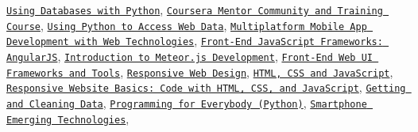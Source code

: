 \documentclass[letterpaper]{article}
\renewenvironment{itemize}{
  \begin{list}{}{
    \setlength{\leftmargin}{1.5em}
  }
}{
  \end{list}
}
\begin{document}
\begin{itemize}

  \href{https://www.coursera.org/account/accomplishments/certificate/V6SUEBUTNR72?lipi=urn%3Ali%3Apage%3Ad_flagship3_profile_view_base%3Bot6rr9dtS3WBieVYcbWG0Q%3D%3D}{\tt Using Databases with Python},
  \href{https://www.coursera.org/account/accomplishments/verify/P89HGQTM8BRU?lipi=urn%3Ali%3Apage%3Ad_flagship3_profile_view_base%3Bot6rr9dtS3WBieVYcbWG0Q%3D%3D}{\tt Coursera Mentor Community and Training Course},
  \href{https://www.coursera.org/account/accomplishments/verify/UCHV3GUX82V4?lipi=urn%3Ali%3Apage%3Ad_flagship3_profile_view_base%3Bot6rr9dtS3WBieVYcbWG0Q%3D%3D}{\tt Using Python to Access Web Data},
  \href{https://www.coursera.org/account/accomplishments/verify/8SRK8FNBN8MR?lipi=urn%3Ali%3Apage%3Ad_flagship3_profile_view_base%3Bot6rr9dtS3WBieVYcbWG0Q%3D%3D}{\tt Multiplatform Mobile App Development with Web Technologies},
  \href{https://www.coursera.org/account/accomplishments/records/9C8QWTNG6PR7?lipi=urn%3Ali%3Apage%3Ad_flagship3_profile_view_base%3Bot6rr9dtS3WBieVYcbWG0Q%3D%3D}{\tt Front-End JavaScript Frameworks: AngularJS},
  \href{https://www.coursera.org/account/accomplishments/records/CZHBPE43RH5C?lipi=urn%3Ali%3Apage%3Ad_flagship3_profile_view_base%3Bot6rr9dtS3WBieVYcbWG0Q%3D%3D}{\tt Introduction to Meteor.js Development},
  \href{https://www.coursera.org/account/accomplishments/records/6P9Q9L5GH9PD?lipi=urn%3Ali%3Apage%3Ad_flagship3_profile_view_base%3Bot6rr9dtS3WBieVYcbWG0Q%3D%3D}{\tt Front-End Web UI Frameworks and Tools},
  \href{https://www.coursera.org/account/accomplishments/records/7TE5WJQ694ZG?lipi=urn%3Ali%3Apage%3Ad_flagship3_profile_view_base%3Bot6rr9dtS3WBieVYcbWG0Q%3D%3D}{\tt Responsive Web Design},
  \href{https://www.coursera.org/account/accomplishments/records/EMNALGEK5R3L?lipi=urn%3Ali%3Apage%3Ad_flagship3_profile_view_base%3Bot6rr9dtS3WBieVYcbWG0Q%3D%3D}{\tt HTML, CSS and JavaScript},
  \href{https://www.coursera.org/account/accomplishments/records/YTYE7E2RLJLS?lipi=urn%3Ali%3Apage%3Ad_flagship3_profile_view_base%3Bot6rr9dtS3WBieVYcbWG0Q%3D%3D}{\tt Responsive Website Basics: Code with HTML, CSS, and JavaScript},
  \href{https://www.coursera.org/account/accomplishments/verify/VPCZ6BSM9G?lipi=urn%3Ali%3Apage%3Ad_flagship3_profile_view_base%3Bot6rr9dtS3WBieVYcbWG0Q%3D%3D}{\tt Getting and Cleaning Data},
  \href{https://www.coursera.org/account/accomplishments/verify/UXPVRHYVDD?lipi=urn%3Ali%3Apage%3Ad_flagship3_profile_view_base%3Bot6rr9dtS3WBieVYcbWG0Q%3D%3D}{\tt Programming for Everybody (Python)},
  \href{https://www.coursera.org/account/accomplishments/verify/AWAVE7M5AMFV?lipi=urn%3Ali%3Apage%3Ad_flagship3_profile_view_base%3Bot6rr9dtS3WBieVYcbWG0Q%3D%3D}{\tt Smartphone Emerging Technologies},

\end{itemize}
\end{document}

